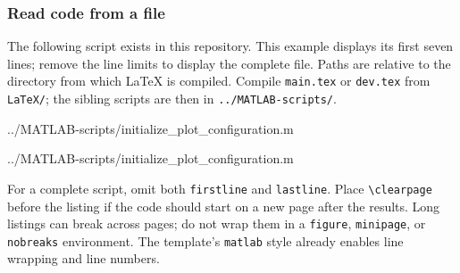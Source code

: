\subsubsection*{Read code from a file}
The following script exists in this repository. This example displays its
first seven lines; remove the line limits to display the complete file.
Paths are relative to the directory from which LaTeX is compiled.
Compile \texttt{main.tex} or \texttt{dev.tex} from \texttt{LaTeX/};
the sibling scripts are then in \texttt{../MATLAB-scripts/}.
\begin{referencecode}

    {../MATLAB-scripts/initialize_plot_configuration.m}
\end{referencecode}


    {../MATLAB-scripts/initialize_plot_configuration.m}

For a complete script, omit both \texttt{firstline} and \texttt{lastline}.
Place \verb|\clearpage| before the listing if the code should start on a
new page after the results. Long listings can break across pages; do not
wrap them in a \texttt{figure}, \texttt{minipage}, or \texttt{nobreaks}
environment. The template's \texttt{matlab} style already enables line
wrapping and line numbers.
